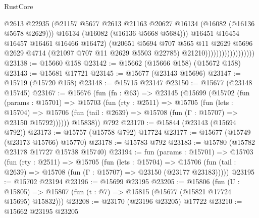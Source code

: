 \begin{lexlean}{RustCore}
\begin{coremodule}
                                          @2613
                                          @22935
                                          (@21157
                                            @5677
                                            @2613
                                            @21163
                                            @20627
                                            @16134
                                            (@16082 (@16136 @5678 @2629)))
                                          @16134
                                          (@16082 (@16136 @5668 @5684)))
                                        @16451
                                        @16454
                                        @16457
                                        @16461
                                        @16466
                                        @16472)
                                      (@20651
                                        @5694
                                        @707
                                        @565
                                        @11
                                        @2629
                                        @5696
                                        @2629
                                        @4714
                                        (@21097 @707 @11 @2629 @5503 @22785)
                                        @21210))))))))))))))))))
@23138 := @15660 @158
@23142 := @15662 (@15666 @158) (@15672 @158)
@23143 := @15681 @17721
@23145 := @15677 (@23143 @15696)
@23147 := @15719 (@15720 @158)
@23148 := @15715 @23147
@23150 := @15677 (@23148 @15745)
@23167 := @15676
    (fun (fn : @63) =>
    @23145
      (@15699
        (@15702
          (fun (params : @15701) =>
          @15703
            (fun (rty : @2511) =>
            @15705
              (fun (lets : @15704) =>
              @15706 (fun (tail : @2639) => @15708 (fun (Γ : @15707) => @23150 @15792))))))
        @15838))
    @792
@23170 := @15844 (@23143 (@15694 @792))
@23173 := @15757 (@15758 @792) @17724
@23177 := @15677 (@15749 (@23173 @15766) @15770)
@23178 := @15783 @792
@23183 := @15780 (@15782 @23178 @17727 @15738 @15740)
@23194 := fun (params : @15701) =>
  @15703
    (fun (rty : @2511) =>
    @15705
      (fun (lets : @15704) =>
      @15706 (fun (tail : @2639) => @15708 (fun (Γ : @15707) => @23150 (@23177 @23183)))))
@23195 := @15702 @23194
@23196 := @15699 @23195
@23205 := @15806
    (fun (U : @15805) => @15807 (fun (t : @7) => @15815 (@15677 (@15821 @17724 @15695) @15832)))
@23208 := @23170 (@23196 @23205) @17722
@23210 := @15662 @23195 @23205

\end{coremodule}
\end{lexlean}
